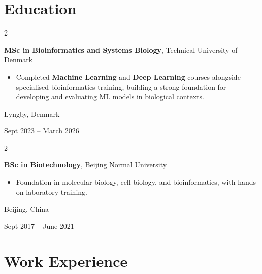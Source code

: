 \documentclass[10pt, letterpaper]{article}
\newenvironment{highlights}{
    \begin{itemize}[
        topsep=0.10 cm,
        parsep=0.10 cm,
        partopsep=0pt,
        itemsep=0pt,
        leftmargin=0.4 cm + 10pt
    ]
}{
    \end{itemize}
} %
\newenvironment{twocolentry}[2][]{
    \onecolentry
    \def\secondColumn{#2}
    \setcolumnwidth{\fill, 4.5 cm}
    \begin{paracol}{2}
}{
    \switchcolumn \raggedleft \secondColumn
    \end{paracol}
    \endonecolentry
} %
\begin{document}
    \section{Education}

        \begin{twocolentry}{
    Lyngby, Denmark

    Sept 2023 -- March 2026
}
    \textbf{MSc in Bioinformatics and Systems Biology}, Technical University of Denmark
    \begin{highlights}
        \item Completed \textbf{Machine Learning} and \textbf{Deep Learning} courses alongside specialised bioinformatics training, building a strong foundation for developing and evaluating ML models in biological contexts.
    \end{highlights}
\end{twocolentry}

        \vspace{0.3 cm}

\begin{twocolentry}{
    Beijing, China

    Sept 2017 -- June 2021
}
    \textbf{BSc in Biotechnology}, Beijing Normal University
    \begin{highlights}
        \item Foundation in molecular biology, cell biology, and bioinformatics, with hands-on laboratory training.
    \end{highlights}
\end{twocolentry}

    \section{Work Experience}
\end{document}
